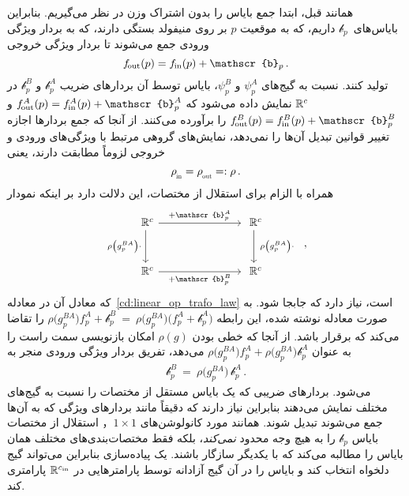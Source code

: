 همانند قبل، ابتدا جمع بایاس را بدون اشتراک وزن در نظر می‌گیریم.
بنابراین بایاس‌های~$\mathscr{b}_p$ داریم، که به موقعیت $p$ بر روی منیفولد بستگی دارند، که به بردار ویژگی ورودی جمع می‌شوند تا بردار ویژگی خروجی
\begin{align}
	\fout(p) = \fin(p) + \mathscr{b}_p \,.
\end{align}
تولید کنند.
نسبت به گیج‌های $\psi_p^A$ و $\psi_p^B$، بایاس توسط آن بردارهای ضریب $\mathscr{b}_p^A$ و $\mathscr{b}_p^B$ در $\mathbb{R}^c$ نمایش داده می‌شود که $\fout^A(p) = \fin^A(p) + \mathscr{b}_p^A$ و $\fout^B(p) = \fin^B(p) + \mathscr{b}_p^B$ را برآورده می‌کنند.
از آنجا که جمع بردارها اجازه تغییر قوانین تبدیل آن‌ها را نمی‌دهد، نمایش‌های گروهی مرتبط با ویژگی‌های ورودی و خروجی لزوماً مطابقت دارند، یعنی
\begin{align}
	\rhoin = \rhoout =: \rho \,.
\end{align}
همراه با الزام برای استقلال از مختصات، این دلالت دارد بر اینکه نمودار
\begin{equation}\label{eq:bias_trafo_law}
	\begin{tikzcd}[column sep=75pt, row sep=30pt, font=\normalsize]
		\R^c
		\arrow[d, "\rho \big(g_p^{BA}\big)\cdot\,"']
		\arrow[r, "+\mathscr{b}_p^A"]
		&
		\R^c
		\arrow[d, "\ \rho\big( g_p^{BA}\big) \cdot"]
		\\
		\R^c
		\arrow[r, "+\mathscr{b}_p^B"']
		&
		\R^c
	\end{tikzcd}
	\ \ ,
\end{equation}
که معادل آن در معادله~\eqref{cd:linear_op_trafo_law} است، نیاز دارد که جابجا شود.
به صورت معادله نوشته شده، این رابطه
$\rho\big(g_p^{BA}\big) f^A_p + \mathscr{b}_p^B \ =\ \rho\big(g_p^{BA}\big) \big(f^A_p + \mathscr{b}_p^A\big)$
را تقاضا می‌کند که برقرار باشد.
از آنجا که خطی بودن $\rho(g)$ امکان بازنویسی سمت راست را به عنوان
$\rho\big(g_p^{BA}\big) f^A_p + \rho\big(g_p^{BA}\big) \mathscr{b}_p^A$
می‌دهد، تفریق بردار ویژگی ورودی منجر به
\begin{align}\label{eq:bias_trafo_non_shared}
	\mathscr{b}_p^B\ =\ \rho\big(g_p^{BA}\big) \, \mathscr{b}_p^A \,.
\end{align}
می‌شود.
بردارهای ضریبی که یک بایاس مستقل از مختصات را نسبت به گیج‌های مختلف نمایش می‌دهند بنابراین نیاز دارند که دقیقاً مانند بردارهای ویژگی که به آن‌ها جمع می‌شوند تبدیل شوند.
همانند مورد کانولوشن‌های $1\times1$， استقلال از مختصات بایاس $\mathscr{b}_p$ را به هیچ وجه محدود \emph{نمی‌کند}، بلکه فقط مختصات‌بندی‌های مختلف همان بایاس را مطالبه می‌کند که با یکدیگر سازگار باشند.
یک پیاده‌سازی بنابراین می‌تواند گیج دلخواه انتخاب کند و بایاس را در آن گیج آزادانه توسط پارامترهایی در $\mathbb{R}^{{c_\textup{in}}}$ پارامتری کند.


